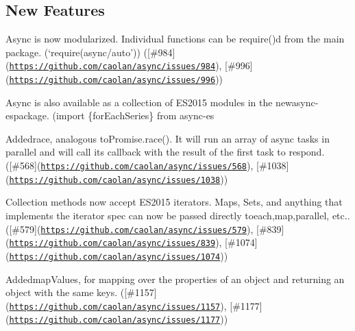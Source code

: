 \subsection*{New Features}


\begin{DoxyItemize}
\item Async is now modularized. Individual functions can be {\ttfamily require()}d from the main package. (`require(\textquotesingle{}async/auto'){\ttfamily ) (\mbox{[}\#984\mbox{]}(\href{https://github.com/caolan/async/issues/984}{\tt https\+://github.\+com/caolan/async/issues/984}), \mbox{[}\#996\mbox{]}(\href{https://github.com/caolan/async/issues/996}{\tt https\+://github.\+com/caolan/async/issues/996}))}
\item {\ttfamily Async is also available as a collection of E\+S2015 modules in the new}async-\/es{\ttfamily package. (}import \{for\+Each\+Series\} from \textquotesingle{}async-\/es
\item {\ttfamily Added}race{\ttfamily , analogous to}Promise.\+race(){\ttfamily . It will run an array of async tasks in parallel and will call its callback with the result of the first task to respond. (\mbox{[}\#568\mbox{]}(\href{https://github.com/caolan/async/issues/568}{\tt https\+://github.\+com/caolan/async/issues/568}), \mbox{[}\#1038\mbox{]}(\href{https://github.com/caolan/async/issues/1038}{\tt https\+://github.\+com/caolan/async/issues/1038}))}
\item {\ttfamily Collection methods now accept E\+S2015 iterators. Maps, Sets, and anything that implements the iterator spec can now be passed directly to}each{\ttfamily ,}map{\ttfamily ,}parallel{\ttfamily , etc.. (\mbox{[}\#579\mbox{]}(\href{https://github.com/caolan/async/issues/579}{\tt https\+://github.\+com/caolan/async/issues/579}), \mbox{[}\#839\mbox{]}(\href{https://github.com/caolan/async/issues/839}{\tt https\+://github.\+com/caolan/async/issues/839}), \mbox{[}\#1074\mbox{]}(\href{https://github.com/caolan/async/issues/1074}{\tt https\+://github.\+com/caolan/async/issues/1074}))}
\item {\ttfamily Added}map\+Values{\ttfamily , for mapping over the properties of an object and returning an object with the same keys. (\mbox{[}\#1157\mbox{]}(\href{https://github.com/caolan/async/issues/1157}{\tt https\+://github.\+com/caolan/async/issues/1157}), \mbox{[}\#1177\mbox{]}(\href{https://github.com/caolan/async/issues/1177}{\tt https\+://github.\+com/caolan/async/issues/1177}))}

\end{DoxyItemize}
